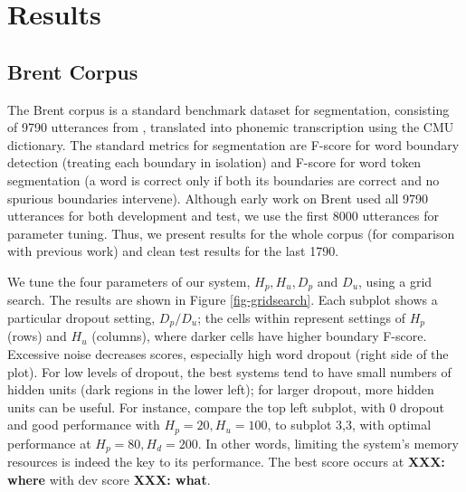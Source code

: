 \documentclass[11pt,letterpaper]{article}
\newcommand{\xxx}[1]{\textbf{\color{red}XXX: #1}}
\begin{document}
\section{Results}

\subsection{Brent Corpus}

The Brent corpus \cite{Brent99} is a standard benchmark dataset for
segmentation, consisting of 9790 utterances from
, translated into phonemic transcription using
the CMU dictionary. The standard metrics for segmentation are F-score
for word boundary detection (treating each boundary in isolation) and
F-score for word token segmentation (a word is correct only if both
its boundaries are correct and no spurious boundaries
intervene). Although early work on Brent used all 9790 utterances for
both development and test, we use the first 8000 utterances for
parameter tuning. Thus, we present results for the whole corpus (for
comparison with previous work) and clean test results for the last
1790.

We tune the four parameters of our system, $H_p, H_u, D_p$ and $D_u$,
using a grid search. The results are shown in Figure
\ref{fig-gridsearch}. Each subplot shows a particular dropout setting,
$D_p/D_u$; the cells within represent settings of $H_p$ (rows) and
$H_u$ (columns), where darker cells have higher boundary
F-score. Excessive noise decreases scores, especially high word
dropout (right side of the plot). For low levels of dropout, the best
systems tend to have small numbers of hidden units (dark regions in
the lower left); for larger dropout, more hidden units can be
useful. For instance, compare the top left subplot, with 0 dropout and
good performance with $H_p=20, H_u=100$, to subplot 3,3, with optimal
performance at $H_p=80, H_d=200$. In other words, limiting the
system's memory resources is indeed the key to its performance. The
best score occurs at \xxx{where} with dev score \xxx{what}.
\end{document}
